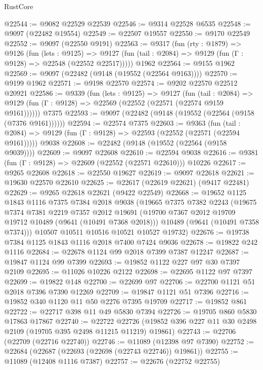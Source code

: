 \begin{lexlean}{RustCore}
\begin{coremodule}
@22544 := @9082 @22529 @22539
@22546 := @9314 @22528 @6535
@22548 := @9097 (@22482 @19554)
@22549 := @22507 @19557
@22550 := @9170 @22549
@22552 := @9097 (@22550 @9191)
@22563 := @9317
    (fun (rty : @1879) =>
    @9126
      (fun (lets : @9125) =>
      @9127 (fun (tail : @2084) => @9129 (fun (Γ : @9128) => @22548 (@22552 @22517)))))
    @1962
@22564 := @9155 @1962
@22569 := @9097 (@22482 (@9148 (@19552 (@22564 @9163))))
@22570 := @9199 @1962
@22571 := @9198 @22570
@22574 := @9202 @22570 @22512 @20921
@22586 := @9339
    (fun (lets : @9125) =>
    @9127
      (fun (tail : @2084) =>
      @9129 (fun (Γ : @9128) => @22569 (@22552 (@22571 (@22574 @9159 @9161))))))
    @7375
@22593 := @9097 (@22482 (@9148 (@19552 (@22564 (@9158 (@7376 @9161))))))
@22594 := @22574 @7375
@22603 := @9363
    (fun (tail : @2084) => @9129 (fun (Γ : @9128) => @22593 (@22552 (@22571 (@22594 @9161)))))
    @9038
@22608 := @22482 (@9148 (@19552 (@22564 (@9158 @9039))))
@22609 := @9097 @22608
@22610 := @22594 @9038
@22616 := @9381 (fun (Γ : @9128) => @22609 (@22552 (@22571 @22610))) @10226
@22617 := @9265 @22608
@22618 := @22550 @19627
@22619 := @9097 @22618
@22621 := @19630 @22570 @22610
@22625 := @22617 (@22619 @22621) (@9417 @22481)
@22629 := @9265 @22618 @22621 (@9422 @22549)
@22668 := @19652
    @1125
    @1843
    @1116
    @7375
    @7384
    @2018
    @9038
    (@19665
      @7375
      @7382
      @2243
      (@19675
        @7374
        @7381
        @2219
        @7357
        @2012
        @19691
        (@19700 @7367 @2012 @19709 @19712 @10489 (@9641 (@10491 @7368 @2018)))
        @10489
        (@9641 (@10491 @7358 @7374)))
      @10507
      @10511
      @10516
      @10521
      @10527
      @19732)
@22676 := @19738 @7384 @1125 @1843 @1116 @2018 @7400 @7424 @9036
@22678 := @19822 @242 @1116
@22684 := @22678 @1124 @99 @2018 @7399 @7387 @12247
@22687 := @19847 @1124 @99 @7399
@22693 := @19852 @1122 @227 @97 @30 @7397 @2109
@22695 := @11026 @10226 @2122
@22698 := @22695 @1122 @97 @7397
@22699 := @19822 @148
@22700 := @22699 @97
@22706 := @22700 @1121 @51 @2018 @7396 @7390 @12269
@22709 := @19847 @1121 @51 @7396
@22716 := @19852 @340 @1120 @11 @50 @2276 @7395 @19709
@22717 := @19852 @861
@22722 := @22717 @398 @11 @49 @5830 @7394
@22726 := @19705 @860 @5830 @17863 @17867
@22740 := @22722
    @22726
    (@19852 @396 @227 @11 @30 @2498 @2109 (@19705 @395 @2498 @11215 @11219) @19861)
@22743 := @22706 (@22709 (@22716 @22740))
@22746 := @11089 (@12398 @97 @7390)
@22752 := @22684 (@22687 (@22693 (@22698 (@22743 @22746)) @19861))
@22755 := @11089 (@12408 @1116 @7387)
@22757 := @22676 (@22752 @22755)

\end{coremodule}
\end{lexlean}
